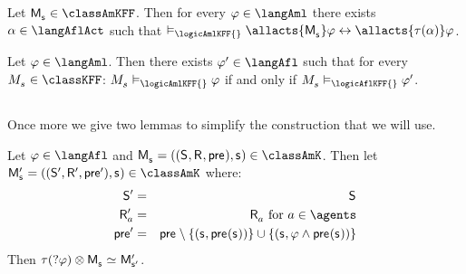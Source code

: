 \begin{corollary}
    Let $\aPModel{\aStateS} \in \classAmKFF$.
    Then for every $\phi \in \langAml$ there exists $\alpha \in \langAflAct$ such that $\entails_\logicAmlKFF{} \allacts{\aPModel{\aStateS}} \phi \iff \allacts{\tau(\alpha)} \phi$.
\end{corollary}

\begin{corollary}
    Let $\phi \in \langAml$. 
    Then there exists $\phi' \in \langAfl$ such that for every $\kPModel{\kStateS} \in \classKFF$: $\kPModel{\kStateS} \entails_\logicAmlKFF{} \phi$ if and only if $\kPModel{\kStateS} \entails_\logicAflKFF{} \phi'$.
\end{corollary}

\subsection{\classS{}}

Once more we give two lemmas to simplify the construction that we will use.

\begin{lemma}\label{afl-s-construction-test}
    Let $\phi \in \langAfl$ and $\aPModel{\aStateS} = \aPModelTuple{\aStateS} \in \classAmK$.
    Then let $\aPModel[\prime]{\aStateS} = \aPModelTuple[\prime]{\aStateS} \in \classAmK$ where:
    \begin{eqnarray*}
        \aStates[\prime] &=& \aStates\\
        \aAccessibility[\prime]{\agentA} &=& \aAccessibility{\agentA} \text{ for } \agentA \in \agents\\
        \aPrecondition[\prime] &=& \aPrecondition \setminus \{(\aStateS, \aPrecondition(\aStateS))\} \cup \{(\aStateS, \phi \land \aPrecondition(\aStateS))\}
    \end{eqnarray*}
    Then $\tau(\test{\phi}) \exec \aPModel{\aStateS} \bisimilar \aPModel[\prime]{\aStateS[\prime]}$.
\end{lemma}

